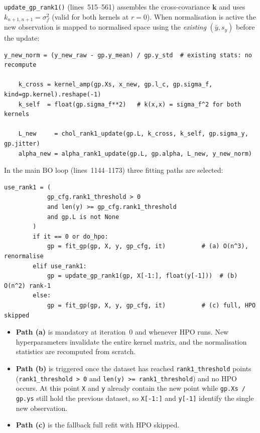 \documentclass[11pt,a4paper]{article}
\theoremstyle{remark}
\newcommand{\coderange}[2]{lines~#1--#2}
\newcommand{\codefn}[1]{\texttt{#1()}}
\begin{document}
\codefn{update\_gp\_rank1} (\coderange{515}{561}) assembles the cross-covariance
$\bm{k}$ and uses $k_{n+1,n+1} = \sigma_f^2$ (valid for both kernels at $r=0$).
When normalisation is active the new observation is mapped to normalised space
using the \emph{existing} $(\bar{y}, s_y)$ before the update:

\begin{lstlisting}[firstnumber=539, caption=\codefn{update\_gp\_rank1}]
    y_new_norm = (y_new_raw - gp.y_mean) / gp.y_std  # existing stats: no recompute

    k_cross = kernel_amp(gp.Xs, x_new, gp.l_c, gp.sigma_f, kind=gp.kernel).reshape(-1)
    k_self  = float(gp.sigma_f**2)   # k(x,x) = sigma_f^2 for both kernels

    L_new     = chol_rank1_update(gp.L, k_cross, k_self, gp.sigma_y, gp.jitter)
    alpha_new = alpha_rank1_update(gp.L, gp.alpha, L_new, y_new_norm)
\end{lstlisting}

In the main BO loop (\coderange{1144}{1173}) three fitting paths are selected:

\begin{lstlisting}[firstnumber=1164, caption=Fitting path selection in \codefn{bayesian\_optimization}]
        use_rank1 = (
            gp_cfg.rank1_threshold > 0
            and len(y) >= gp_cfg.rank1_threshold
            and gp.L is not None
        )
        if it == 0 or do_hpo:
            gp = fit_gp(gp, X, y, gp_cfg, it)          # (a) O(n^3), renormalise
        elif use_rank1:
            gp = update_gp_rank1(gp, X[-1:], float(y[-1]))  # (b) O(n^2) rank-1
        else:
            gp = fit_gp(gp, X, y, gp_cfg, it)          # (c) full, HPO skipped
\end{lstlisting}

\begin{itemize}
  \item \textbf{Path (a)} is mandatory at iteration~0 and whenever HPO runs.
        New hyperparameters invalidate the entire kernel matrix, and the
        normalisation statistics are recomputed from scratch.
  \item \textbf{Path (b)} is triggered once the dataset has reached
        \texttt{rank1\_threshold} points (\texttt{rank1\_threshold > 0} and
        \texttt{len(y) >= rank1\_threshold}) and no HPO occurs.  At this
        point \texttt{X} and \texttt{y} already contain the new point while
        \texttt{gp.Xs / gp.ys} still hold the previous dataset, so
        \texttt{X[-1:]} and \texttt{y[-1]} identify the single new
        observation.
  \item \textbf{Path (c)} is the fallback full refit with HPO skipped.
\end{itemize}
\end{document}
